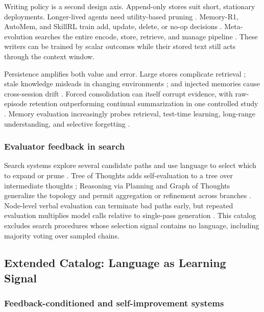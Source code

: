 Writing policy is a second design axis. Append-only stores suit short, stationary deployments. Longer-lived agents need utility-based pruning \citep{cao2025remember,zhang2026liveevo}. Memory-R1, AutoMem, and SkillRL train add, update, delete, or no-op decisions \citep{yan2025memoryr1,wu2026automem,xia2026skillrl}. Meta-evolution searches the entire encode, store, retrieve, and manage pipeline \citep{zhang2025memevolve,liu2026mempro,zhang2026memskill}. These writers can be trained by scalar outcomes while their stored text still acts through the context window.

Persistence amplifies both value and error. Large stores complicate retrieval \citep{park2023genagents}; stale knowledge misleads in changing environments \citep{zhang2025survey}; and injected memories cause cross-session drift \citep{dong2026memory}. Forced consolidation can itself corrupt evidence, with raw-episode retention outperforming continual summarization in one controlled study \citep{zhang2026useful}. Memory evaluation increasingly probes retrieval, test-time learning, long-range understanding, and selective forgetting \citep{tan2025membench,hu2025evaluating,wei2025evomemory,belikova2026managing}.

\subsubsection{Evaluator feedback in search}
\label{supp:subsec:deliberative-search}

Search systems explore several candidate paths and use language to select which to expand or prune \citep{wang-etal-2025-dont}. Tree of Thoughts adds self-evaluation to a tree over intermediate thoughts \citep{wei2022chain,yao2023tree}; Reasoning via Planning and Graph of Thoughts generalize the topology and permit aggregation or refinement across branches \citep{hao2023reasoning,besta2024graph}. Node-level verbal evaluation can terminate bad paths early, but repeated evaluation multiplies model calls relative to single-pass generation \citep{xie2023self}. This catalog excludes search procedures whose selection signal contains no language, including majority voting over sampled chains.

\subsection{Extended Catalog: Language as Learning Signal}
\label{supp:sec:learning}

\subsubsection{Feedback-conditioned and self-improvement systems}
\label{supp:subsec:learning-conditioned}

